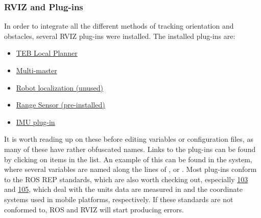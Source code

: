 \subsubsection{RVIZ and Plug-ins}
In order to integrate all the different methods of tracking orientation and obstacles, several RVIZ plug-ins were installed.
The installed plug-ins are:
\begin{itemize}
\item \href{http://wiki.ros.org/teb_local_planner}{TEB Local Planner}
\item \href{http://wiki.ros.org/multimaster_fkie}{Multi-master}
\item \href{http://docs.ros.org/kinetic/api/robot_localization/html/index.html}{Robot localization (unused)}
\item \href{http://wiki.ros.org/range_sensor_layer}{Range Sensor (pre-installed)}
\item \href{http://wiki.ros.org/rviz_imu_plugin}{IMU plug-in}
\end{itemize}
It is worth reading up on these before editing variables or configuration files, as many of these have rather obfuscated names.
Links to the plug-ins can be found by clicking on items in the list.
An example of this can be found in the  system, where several variables are named along the lines of , or .
Most plug-ins conform to the ROS REP standards, which are also worth checking out, especially \href{https://www.ros.org/reps/rep-0103.html}{103}  and \href{https://www.ros.org/reps/rep-0105.html}{105}, which deal with the units data are measured in and the coordinate systems used in mobile platforms, respectively.
If these standards are not conformed to, ROS and RVIZ will start producing errors.

\newpage